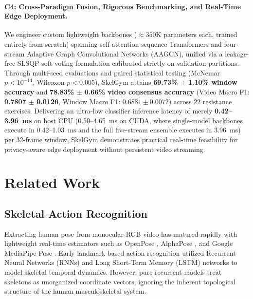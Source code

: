 \documentclass[runningheads]{llncs}
\begin{document}
\paragraph{C4: Cross-Paradigm Fusion, Rigorous Benchmarking, and Real-Time Edge Deployment.} We engineer custom lightweight backbones ($\approx 350\text{K}$ parameters each, trained entirely from scratch) spanning self-attention sequence Transformers and four-stream Adaptive Graph Convolutional Networks (AAGCN), unified via a leakage-free SLSQP soft-voting formulation \cite{kraft1988,virtanen2020} calibrated strictly on validation partitions. Through multi-seed evaluations and paired statistical testing (McNemar $p < 10^{-14}$, Wilcoxon $p < 0.005$), SkelGym attains \textbf{69.73\% $\pm$ 1.10\% window accuracy} and \textbf{78.83\% $\pm$ 0.66\% video consensus accuracy} (Video Macro F1: \textbf{0.7807 $\pm$ 0.0126}, Window Macro F1: $0.6881 \pm 0.0072$) across 22 resistance exercises. Delivering an ultra-low classifier inference latency of merely \textbf{0.42--3.96~ms} on host CPU (0.50--4.65~ms on CUDA, where single-model backbones execute in 0.42--1.03~ms and the full five-stream ensemble executes in 3.96~ms) per 32-frame window, SkelGym demonstrates practical real-time feasibility for privacy-aware edge deployment without persistent video streaming.

\section{Related Work}

\subsection{Skeletal Action Recognition}
Extracting human pose from monocular RGB video has matured rapidly with lightweight real-time estimators such as OpenPose \cite{cao2019}, AlphaPose \cite{fang2022}, and Google MediaPipe Pose \cite{chuankun2019,bazarevsky2020}. Early landmark-based action recognition utilized Recurrent Neural Networks (RNNs) and Long Short-Term Memory (LSTM) networks \cite{hochreiter1997long,graves2005,li2017} to model skeletal temporal dynamics. However, pure recurrent models treat skeletons as unorganized coordinate vectors, ignoring the inherent topological structure of the human musculoskeletal system.
\end{document}
